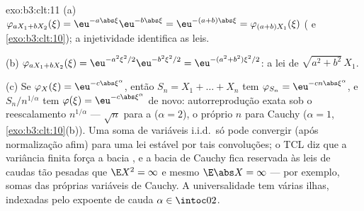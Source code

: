 \begin{solution}{exo:b3:clt:11}
(a) $\varphi_{aX_1 + bX_2}(\xi) =
\eu^{-a\abs\xi}\eu^{-b\abs\xi} = \eu^{-(a+b)\abs\xi} =
\varphi_{(a+b)X_1}(\xi)$ ( e
\cref{exo:b3:clt:10}); a injetividade identifica as leis.

(b) $\varphi_{aX_1+bX_2}(\xi) = \eu^{-a^2\xi^2/2}
\eu^{-b^2\xi^2/2} = \eu^{-(a^2+b^2)\xi^2/2}$: a lei de
$\sqrt{a^2+b^2}\,X_1$.

(c) Se $\varphi_X(\xi) = \eu^{-c\abs\xi^\alpha}$, então
$S_n = X_1 + \dots + X_n$ tem $\varphi_{S_n} =
\eu^{-cn\abs\xi^\alpha}$, e $S_n/n^{1/\alpha}$ tem
$\varphi(\xi) = \eu^{-c\abs\xi^\alpha}$ de novo: autorreprodução
exata sob o reescalamento $n^{1/\alpha}$ ---
$\sqrt n$ para a  ($\alpha = 2$), o próprio $n$ para
Cauchy ($\alpha = 1$, \cref{exo:b3:clt:10}(b)). Uma soma de
variáveis i.i.d.\ só pode convergir (após normalização
afim) para uma lei estável por tais convoluções; o TCL diz
que a variância finita força a bacia , e a bacia de
Cauchy fica reservada às leis de caudas tão pesadas que
$\E X^2 = \infty$ e mesmo $\E\abs
X = \infty$ --- por exemplo, somas das próprias variáveis de Cauchy.
A universalidade tem várias ilhas, indexadas pelo expoente
de cauda $\alpha \in \intoc02$.
\end{solution}

